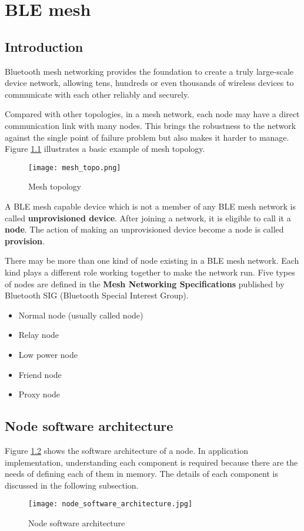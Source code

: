 \documentclass[./main.tex]{subfiles}
\begin{document}
\chapter{BLE mesh}

\section{Introduction}
Bluetooth mesh networking provides the foundation to create a truly large-scale device network, allowing tens, hundreds or even thousands of wireless devices to communicate with each other reliably and securely.

Compared with other topologies, in a mesh network, each node may have a direct communication link with many nodes. This brings the robustness to the network against the single point of failure problem but also makes it harder to manage. Figure \ref{fig:Mesh topology} illustrates a basic example of mesh topology.

\begin{figure}[ht]
    \begin{center}
        \texttt{[image: mesh\_topo.png]}
    \end{center}
    \caption{Mesh topology}
    \label{fig:Mesh topology}
\end{figure}

A BLE mesh capable device which is not a member of any BLE mesh network is called \textbf{unprovisioned device}. After joining a  network, it is eligible to call it a \textbf{node}. The action of making an unprovisioned device become a node is called \textbf{provision}.

There may be more than one kind of node existing in a BLE mesh network. Each kind plays a different role working together to make the network run. Five types of nodes are defined in the \textbf{Mesh Networking Specifications} published by Bluetooth SIG (Bluetooth Special Interest Group).
\begin{itemize}
    \item Normal node (usually called node)
    \item Relay node
    \item Low power node
    \item Friend node
    \item Proxy node
\end{itemize}
\section{Node software architecture}
Figure \ref{fig:Node software architecture} shows the software architecture of a node. In application implementation, understanding each component is required because there are the needs of defining each of them in memory. The details of each component is discussed in the following subsection.
\begin{figure}[ht]
    \begin{center}
        \texttt{[image: node\_software\_architecture.jpg]}
    \end{center}
    \caption{Node software architecture}
    \label{fig:Node software architecture}
\end{figure}
\end{document}
